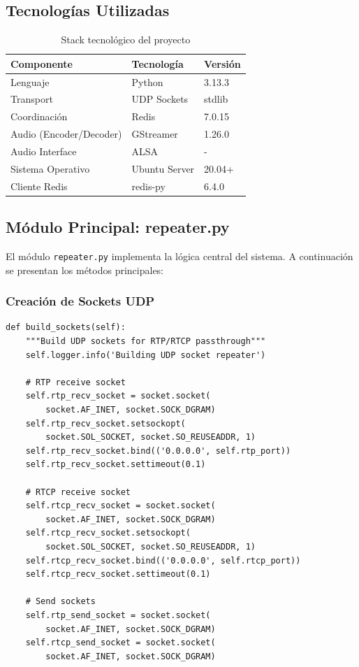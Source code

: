 \documentclass[12pt,a4paper]{article}
\begin{document}
\subsection{Tecnologías Utilizadas}

\begin{table}[H]
\centering
\caption{Stack tecnológico del proyecto}
\label{tab:techstack}
\begin{tabular}{@{}lll@{}}
\toprule
\textbf{Componente} & \textbf{Tecnología} & \textbf{Versión} \\ \midrule
Lenguaje & Python & 3.13.3 \\
Transport & UDP Sockets & stdlib \\
Coordinación & Redis & 7.0.15 \\
Audio (Encoder/Decoder) & GStreamer & 1.26.0 \\
Audio Interface & ALSA & - \\
Sistema Operativo & Ubuntu Server & 20.04+ \\
Cliente Redis & redis-py & 6.4.0 \\
\bottomrule
\end{tabular}
\end{table}

\subsection{Módulo Principal: repeater.py}

El módulo \texttt{repeater.py} implementa la lógica central del sistema. A continuación se presentan los métodos principales:

\subsubsection{Creación de Sockets UDP}

\begin{lstlisting}[style=pythonstyle, caption={Método build\_sockets()}, label={lst:buildsockets}]
def build_sockets(self):
    """Build UDP sockets for RTP/RTCP passthrough"""
    self.logger.info('Building UDP socket repeater')
    
    # RTP receive socket
    self.rtp_recv_socket = socket.socket(
        socket.AF_INET, socket.SOCK_DGRAM)
    self.rtp_recv_socket.setsockopt(
        socket.SOL_SOCKET, socket.SO_REUSEADDR, 1)
    self.rtp_recv_socket.bind(('0.0.0.0', self.rtp_port))
    self.rtp_recv_socket.settimeout(0.1)
    
    # RTCP receive socket
    self.rtcp_recv_socket = socket.socket(
        socket.AF_INET, socket.SOCK_DGRAM)
    self.rtcp_recv_socket.setsockopt(
        socket.SOL_SOCKET, socket.SO_REUSEADDR, 1)
    self.rtcp_recv_socket.bind(('0.0.0.0', self.rtcp_port))
    self.rtcp_recv_socket.settimeout(0.1)
    
    # Send sockets
    self.rtp_send_socket = socket.socket(
        socket.AF_INET, socket.SOCK_DGRAM)
    self.rtcp_send_socket = socket.socket(
        socket.AF_INET, socket.SOCK_DGRAM)
\end{lstlisting}
\end{document}
